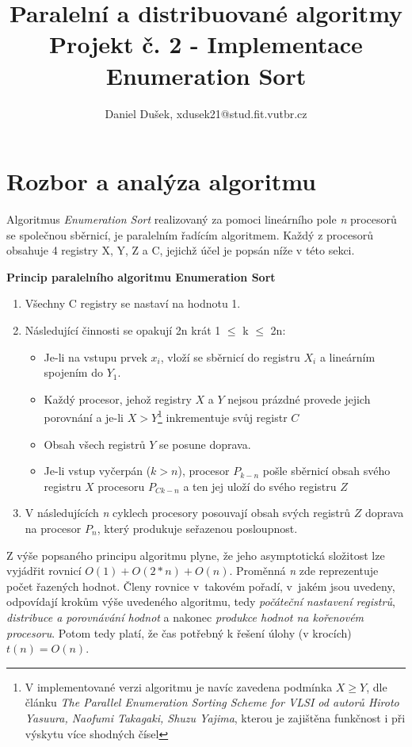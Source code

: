 \documentclass[a4paper,10pt]{article}
\title{Paralelní a distribuované algoritmy \\Projekt č. 2 \-- Implementace Enumeration Sort}
\author{Daniel Dušek, xdusek21@stud.fit.vutbr.cz}
\newcommand{\Omicron}{O}
\begin{document}
    \maketitle

	\section{Rozbor a analýza algoritmu}
	\label{sec:rozbor}
    	\par Algoritmus \textit{Enumeration Sort} realizovaný za pomoci lineárního pole \textit{n} procesorů se společnou sběrnicí, je paralelním řadícím algoritmem. Každý z procesorů obsahuje  4 registry X, Y, Z a C, jejichž účel je popsán níže v této sekci. 

    	\hspace{0.2cm}

    	\textbf{Princip paralelního algoritmu Enumeration Sort}

    	\begin{enumerate}
    		\item Všechny C registry se nastaví na hodnotu 1.
    		\item Následující činnosti se opakují 2n krát 1 $\leq $ k $\leq$ 2n:
    			\begin{itemize}
    				\item{Je-li na vstupu prvek $x_i$, vloží se sběrnicí do registru $X_i$ a lineárním spojením do $Y_1$.}
    				\item{Každý procesor, jehož registry $X$ a $Y$ nejsou prázdné provede jejich porovnání a je-li $X>Y$\footnote{V implementované verzi algoritmu je navíc zavedena podmínka $X \geq Y$, dle článku \textit{The Parallel Enumeration Sorting Scheme for VLSI od autorů Hiroto Yasuura, Naofumi Takagaki, Shuzu Yajima}, kterou je zajištěna funkčnost i při výskytu více shodných čísel} inkrementuje svůj registr $C$}
    				\item{Obsah všech registrů $Y$ se posune doprava.}
    				\item{Je-li vstup vyčerpán ($k>n$), procesor $P_{k-n}$ pošle sběrnicí obsah svého registru $X$ procesoru $P_{Ck-n}$ a ten jej uloží do svého registru $Z$ }
    			\end{itemize}
    		\item V následujících \textit{n} cyklech procesory posouvají obsah svých registrů $Z$ doprava na procesor $P_n$, který produkuje seřazenou posloupnost.
    	\end{enumerate}

    	\par Z výše popsaného principu algoritmu plyne, že jeho asymptotická složitost lze vyjádřit rovnicí $\Omicron \left(1\right) + \Omicron \left(2*n\right) + \Omicron \left(n\right)$. Proměnná \textit{n} zde reprezentuje počet řazených hodnot. Členy rovnice v~takovém pořadí, v~jakém jsou uvedeny, odpovídají krokům výše uvedeného algoritmu, tedy \textit{počáteční nastavení registrů}, \textit{distribuce a porovnávání hodnot} a nakonec \textit{produkce hodnot na kořenovém procesoru}. Potom tedy platí, že čas potřebný k řešení úlohy (v krocích) $t\left(n\right) = \Omicron\left(n\right)$. 
\end{document}
